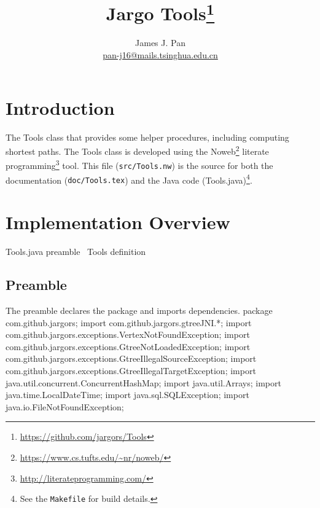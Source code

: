 \documentclass{article}
\title{Jargo Tools\footnote{
  \url{https://github.com/jargors/Tools}}}
\author{James J. Pan\\
  \small{\href{mailto:pan-j16@mails.tsinghua.edu.cn}{pan-j16@mails.tsinghua.edu.cn}}}
\def\nwendcode{\endtrivlist \endgroup}      %
\let\nwdocspar=\par
\begin{document}
\maketitle
\pagestyle{noweb}

\tableofcontents

\section{Introduction}
\label{sec:introduction}
The Tools class that provides some helper procedures, including computing
shortest paths.
The Tools class is developed using the
Noweb\footnote{\url{https://www.cs.tufts.edu/~nr/noweb/}} literate
programming\footnote{\url{http://literateprogramming.com/}} tool.  This file
({\tt{}src/Tools.nw}) is the source for both the documentation ({\tt{}doc/Tools.tex})
and the Java code (Tools.java)\footnote{See the {\tt{}Makefile} for build
details.}.

\section{Implementation Overview}
\endmoddef{}
\LA{}Tools.java preamble~{\nwtagstyle{}}\RA{}
\LA{}\code{}Tools\edoc{} definition~{\nwtagstyle{}}\RA{}
\nwendcode{}\nwdocspar

\subsection{Preamble}
The preamble declares the package and imports dependencies.
\nwenddocs{}\endmoddef{}
package com.github.jargors;
import com.github.jargors.gtreeJNI.*;
import com.github.jargors.exceptions.VertexNotFoundException;
import com.github.jargors.exceptions.GtreeNotLoadedException;
import com.github.jargors.exceptions.GtreeIllegalSourceException;
import com.github.jargors.exceptions.GtreeIllegalTargetException;
import java.util.concurrent.ConcurrentHashMap;
import java.util.Arrays;
import java.time.LocalDateTime;
import java.sql.SQLException;
import java.io.FileNotFoundException;
\nwendcode{}\nwdocspar
\end{document}
